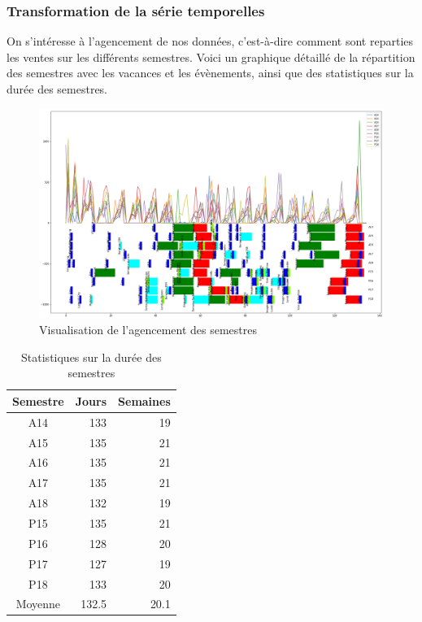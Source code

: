 \subsubsection{Transformation de la série temporelles}
\label{subsec:ts_remapping}

On s'intéresse à l'agencement de nos données, c'est-à-dire comment sont reparties les ventes sur les différents semestres. Voici un graphique détaillé de la répartition des semestres avec les vacances et les évènements, ainsi que des statistiques sur la durée des semestres.

\begin{figure}[ht]
	\centering
	\includegraphics[width=1\textwidth]{figures/semester_sales_with_events.png}
	\caption{Visualisation de l'agencement des semestres}
    \label{fig:semester_events}
\end{figure}

\begin{table}[H]
    \centering
    \begin{tabular}{c|rr}
        \hline
        Semestre & Jours & Semaines \\
        \hline
        A14      &   133 &       19 \\
        A15      &   135 &       21 \\
        A16      &   135 &       21 \\
        A17      &   135 &       21 \\
        A18      &   132 &       19 \\
        P15      &   135 &       21 \\
        P16      &   128 &       20 \\
        P17      &   127 &       19 \\
        P18      &   133 &       20 \\
        \hline
        Moyenne  & 132.5 &     20.1
    \end{tabular}
    \caption{Statistiques sur la durée des semestres}
    \label{tab:semestre_days_stats}
\end{table}

